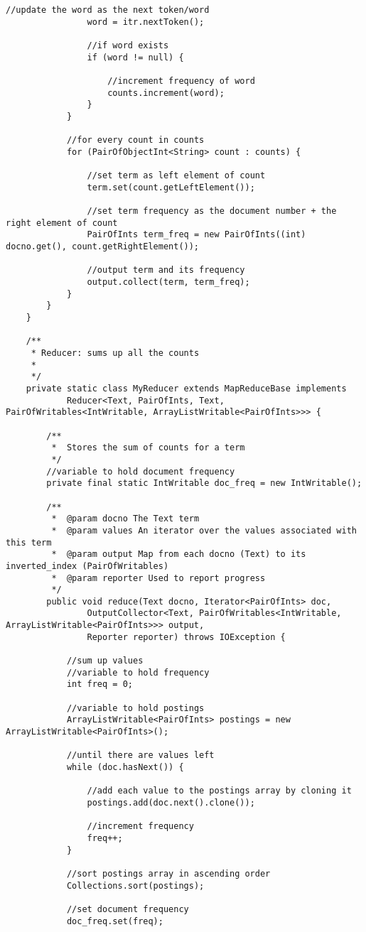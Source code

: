 \documentclass{article} %
\begin{document}
\begin{lstlisting}[style=Java]
				//update the word as the next token/word
				word = itr.nextToken();
				
				//if word exists
				if (word != null) {
					
					//increment frequency of word
					counts.increment(word);
				}
			}
			
			//for every count in counts
			for (PairOfObjectInt<String> count : counts) {
				
				//set term as left element of count
				term.set(count.getLeftElement());
				
				//set term frequency as the document number + the right element of count
				PairOfInts term_freq = new PairOfInts((int) docno.get(), count.getRightElement());
				
				//output term and its frequency
				output.collect(term, term_freq);
			}
		}
	}

	/**
	 * Reducer: sums up all the counts
	 *
	 */
	private static class MyReducer extends MapReduceBase implements
			Reducer<Text, PairOfInts, Text, PairOfWritables<IntWritable, ArrayListWritable<PairOfInts>>> {

		/**
		 *  Stores the sum of counts for a term
		 */
		//variable to hold document frequency
		private final static IntWritable doc_freq = new IntWritable();

		/**
		 *  @param docno The Text term 
		 *  @param values An iterator over the values associated with this term
		 *  @param output Map from each docno (Text) to its inverted_index (PairOfWritables)
		 *  @param reporter Used to report progress
		 */
		public void reduce(Text docno, Iterator<PairOfInts> doc,
				OutputCollector<Text, PairOfWritables<IntWritable, ArrayListWritable<PairOfInts>>> output,
				Reporter reporter) throws IOException {
			
			//sum up values
			//variable to hold frequency
			int freq = 0;
			
			//variable to hold postings
			ArrayListWritable<PairOfInts> postings = new ArrayListWritable<PairOfInts>();
			
			//until there are values left
			while (doc.hasNext()) {
				
				//add each value to the postings array by cloning it
				postings.add(doc.next().clone());
				
				//increment frequency
				freq++;
			}
			
			//sort postings array in ascending order
			Collections.sort(postings);
			
			//set document frequency
			doc_freq.set(freq);
			

\end{lstlisting}
\end{document}

